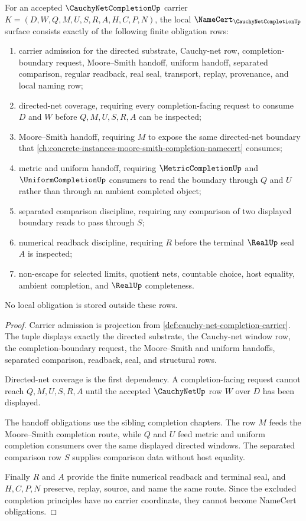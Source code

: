 \begin{theorem}
\label{thm:cauchy-net-completion-namecert-obligations}
For an accepted $\CauchyNetCompletionUp$ carrier $K=(D,W,Q,M,U,S,R,A,H,C,P,N)$, the local $\NameCert_{\CauchyNetCompletionUp}$ surface consists exactly of the following finite obligation rows:
\begin{enumerate}
\item carrier admission for the directed substrate, Cauchy-net row, completion-boundary request, Moore--Smith handoff, uniform handoff, separated comparison, regular readback, real seal, transport, replay, provenance, and local naming row;
\item directed-net coverage, requiring every completion-facing request to consume $D$ and $W$ before $Q,M,U,S,R,A$ can be inspected;
\item Moore--Smith handoff, requiring $M$ to expose the same directed-net boundary that \autoref{ch:concrete-instances-moore-smith-completion-namecert} consumes;
\item metric and uniform handoff, requiring $\MetricCompletionUp$ and $\UniformCompletionUp$ consumers to read the boundary through $Q$ and $U$ rather than through an ambient completed object;
\item separated comparison discipline, requiring any comparison of two displayed boundary reads to pass through $S$;
\item numerical readback discipline, requiring $R$ before the terminal $\RealUp$ seal $A$ is inspected;
\item non-escape for selected limits, quotient nets, countable choice, host equality, ambient completion, and $\RealUp$ completeness.
\end{enumerate}
No local obligation is stored outside these rows.
\end{theorem}
\begin{proof}
Carrier admission is projection from \autoref{def:cauchy-net-completion-carrier}. The tuple displays exactly the directed substrate, the Cauchy-net window row, the completion-boundary request, the Moore--Smith and uniform handoffs, separated comparison, readback, seal, and structural rows.

Directed-net coverage is the first dependency. A completion-facing request cannot reach $Q,M,U,S,R,A$ until the accepted $\CauchyNetUp$ row $W$ over $D$ has been displayed.

The handoff obligations use the sibling completion chapters. The row $M$ feeds the Moore--Smith completion route, while $Q$ and $U$ feed metric and uniform completion consumers over the same displayed directed windows. The separated comparison row $S$ supplies comparison data without host equality.

Finally $R$ and $A$ provide the finite numerical readback and terminal seal, and $H,C,P,N$ preserve, replay, source, and name the same route. Since the excluded completion principles have no carrier coordinate, they cannot become NameCert obligations.
\end{proof}

